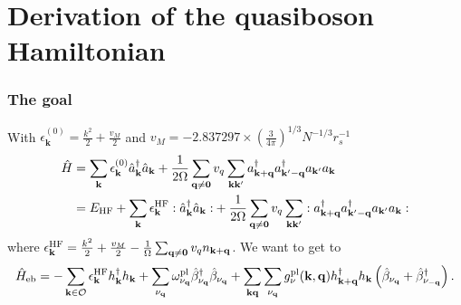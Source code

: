 \section{Derivation of the quasiboson Hamiltonian }
\begin{frame}
    \frametitle{The goal}
With $\epsilon_{\mathbf k}^{(0)}=\frac{k^2}{2}+\frac{v_M}{2}$ and $v_M=-2.837297 \times\left(\frac{3}{4 \pi}\right)^{1 / 3} N^{-1 / 3} r_s^{-1}$
\begin{align}
\hat H
&=
\sum_{\mathbf k}\epsilon_{\mathbf k}^{(0)}\hat a_{\mathbf k}^\dagger \hat a_{\mathbf k}
+
{\frac{1}{2\Omega}
\sum_{\mathbf q\neq\mathbf 0}v_q
\sum_{\mathbf k\mathbf k'}
a_{\mathbf{k}+\mathbf q}^\dagger
a_{\mathbf{k}'-\mathbf q}^\dagger
a_{\mathbf k'}
a_{\mathbf k}}\\
&=
E_{\rm HF}
+
{\sum_{\mathbf k}
\epsilon_{\mathbf k}^{\rm HF}
:
\hat a_{\mathbf k}^\dagger \hat a_{\mathbf k}
:}
+
\frac{1}{2\Omega}
\sum_{\mathbf q\neq\mathbf 0}v_q
\sum_{\mathbf k\mathbf k'}:
a_{\mathbf{k}+\mathbf q}^\dagger
a_{\mathbf{k}'-\mathbf q}^\dagger
a_{\mathbf k'}
a_{\mathbf k}:
\end{align}
where ${
\epsilon_{\mathbf k}^{\rm HF}
}
=
\frac{k^2}{2}
+
\frac{v_M}{2}
-
\frac{1}{\Omega}
\sum_{\mathbf q\neq\mathbf 0}
v_q n_{\mathbf{k}+\mathbf q}
$. \pause We want to get to 
\begin{equation}
    \hat H_{\rm eb}
    =
    -\sum_{\mathbf k\in\mathcal O}
    \epsilon_{\mathbf k}^{\rm HF}
    h_{\mathbf k}^{\dagger}h_{\mathbf k}
    +
    \sum_{\nu_{\mathbf q}}
    \omega_{\nu_{\mathbf q}}^{\rm pl}
    \hat\beta_{\nu_{\mathbf q}}^{\dagger}
    \hat\beta_{\nu_{\mathbf q}}
    +
    \sum_{\mathbf k\mathbf q}
    \sum_{\nu_{\mathbf q}}
    g_{\nu}^{\rm pl}(\mathbf k,\mathbf q)
    h_{\mathbf k+\mathbf q}^{\dagger}
    h_{\mathbf k}
    \left(
        \hat\beta_{\nu_{\mathbf q}}
        +
        \hat\beta_{\nu_{-\mathbf q}}^{\dagger}
    \right).
\end{equation}
\end{frame}
